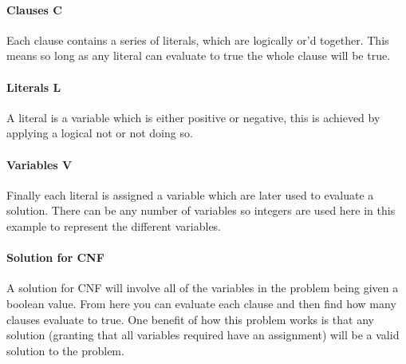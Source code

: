 \documentclass[a4paper]{article}
\begin{document}
\paragraph{Clauses C}\vspace*{-4mm}
Each clause contains a series of literals, which are logically or'd together.
This means so long as any literal can evaluate to true the whole clause will be true.
\paragraph{Literals L}\vspace*{-4mm}
A literal is a variable which is either positive or negative, this is achieved by applying a logical not or not doing so.
\paragraph{Variables V}\vspace*{-4mm}
Finally each literal is assigned a variable which are later used to evaluate a solution.
There can be any number of variables so integers are used here in this example to represent the different variables.
\paragraph{Solution for CNF}
A solution for CNF will involve all of the variables in the problem being given a boolean value.
From here you can evaluate each clause and then find how many clauses evaluate to true.
One benefit of how this problem works is that any solution (granting that all variables required have an assignment) will be a valid solution to the problem.
\end{document}

